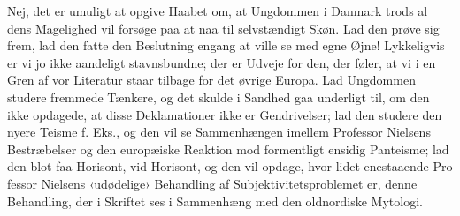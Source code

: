 \documentclass[12pt,a4paper,openany]{book}
\begin{document}
Nej, det er umuligt at opgive Haabet om, at Ungdommen
i Danmark trods al dens Magelighed vil forsøge paa at naa til
selvstændigt Skøn. Lad den prøve sig frem, lad den fatte den
Beslutning engang at ville se med egne Øjne! Lykkeligvis er vi
jo ikke aandeligt stavnsbundne; der er Udveje for den, der føler,
at vi i en Gren af vor Literatur staar tilbage for det øvrige
Europa. Lad Ungdommen studere fremmede Tænkere, og det
skulde i Sandhed gaa underligt til, om den ikke opdagede, at
disse Deklamationer ikke er Gendrivelser; lad den studere den
nyere Teisme f. Eks., og den vil se Sammenhængen imellem
Professor Nielsens Bestræbelser og den europæiske Reaktion
mod formentligt ensidig Panteisme; lad den blot faa Horisont,
vid Horisont, og den vil opdage, hvor lidet enestaaende Pro\-%
fessor Nielsens ‹udødelige› Behandling af Subjektivitetsproblemet
er, denne Behandling, der i Skriftet ses i Sammenhæng med den
oldnordiske Mytologi.
\end{document}
